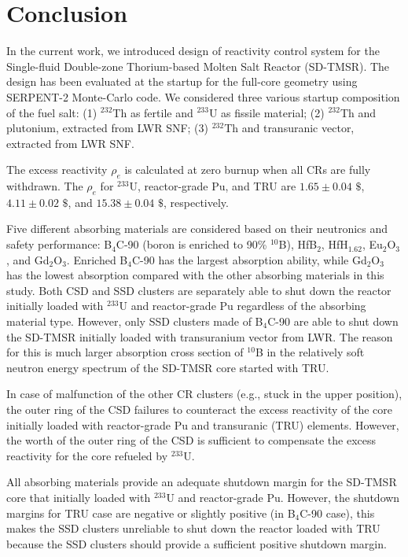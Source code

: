 \section{Conclusion} \label{Conclusion}
In the current work, we introduced design of reactivity control system for the 
Single-fluid Double-zone Thorium-based Molten Salt Reactor (SD-TMSR). The 
design has been evaluated at the startup for the full-core geometry using 
SERPENT-2 Monte-Carlo code. We considered three various startup composition of 
the fuel salt: (1) $^{232}$Th as fertile and $^{233}$U as fissile material; 
(2) $^{232}$Th and plutonium, extracted from \gls{LWR} \gls{SNF}; (3) 
$^{232}$Th and transuranic vector, extracted from \gls{LWR} \gls{SNF}.

The excess reactivity $\rho_e$ is calculated at zero burnup when all CRs are 
fully withdrawn. The $\rho_e$ for $^{233}$U, reactor-grade Pu, and 
TRU are $1.65\pm0.04$ $\$$, $4.11\pm0.02$ $\$$, and $15.38\pm0.04$ $\$$, 
respectively.

Five different absorbing materials are considered based on their neutronics and 
safety performance: B$_4$C-90 (boron is enriched to 90\% $^{10}$B), HfB$_2$, 
HfH$_{1.62}$, Eu$_2$O$_3$, and Gd$_2$O$_3$. Enriched B$_4$C-90 has the largest 
absorption ability, while Gd$_2$O$_3$ has the lowest absorption compared with 
the other absorbing materials in this study. Both CSD and SSD clusters are 
separately able to shut down the reactor initially loaded with $^{233}$U and 
reactor-grade Pu regardless of the absorbing material type. However, only SSD 
clusters made of B$_4$C-90 are able to shut down the SD-TMSR initially loaded 
with transuranium vector from \gls{LWR}. The reason for this is much larger 
absorption cross section of $^{10}$B in the relatively soft neutron energy 
spectrum of the SD-TMSR core started with TRU.

In case of malfunction of the other CR clusters (e.g., stuck in the upper 
position), the outer ring of the CSD failures to counteract the excess 
reactivity of the core initially loaded with reactor-grade Pu and transuranic 
(TRU) elements. However, the worth of the outer ring of the CSD is sufficient 
to compensate the excess reactivity for the core refueled by $^{233}$U.

All absorbing materials provide an adequate shutdown margin for the SD-TMSR 
core that initially loaded with $^{233}$U and reactor-grade Pu. However, the 
shutdown margins for TRU case are negative or slightly positive (in B$_4$C-90 
case), this makes the SSD clusters unreliable to shut down the reactor loaded 
with TRU because the SSD clusters should provide a sufficient positive shutdown margin.

